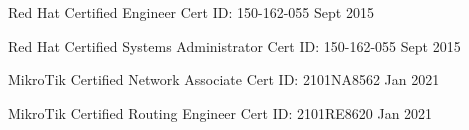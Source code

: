 

\begin{cvcerts}

  \cvcert
    {Red Hat Certified Engineer} %
    {Cert ID: 150-162-055} %
    {Sept 2015} %


  \cvcert
    {Red Hat Certified Systems Administrator} %
    {Cert ID: 150-162-055} %
    {Sept 2015} %

  \cvcert
    {MikroTik Certified Network Associate} %
    {Cert ID: 2101NA8562} %
    {Jan 2021} %
   
  \cvcert
    {MikroTik Certified Routing Engineer} %
    {Cert ID: 2101RE8620} %
    {Jan 2021} %

\end{cvcerts}


